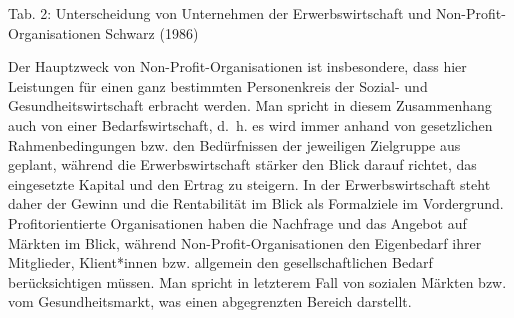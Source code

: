 \documentclass[
  letterpaper,
]{book}
\begin{document}
Tab. 2: Unterscheidung von Unternehmen der Erwerbswirtschaft und
Non-Profit-Organisationen \label{table2}{Schwarz (1986)}

Der Hauptzweck von Non-Profit-Organisationen ist insbesondere, dass hier
Leistungen für einen ganz bestimmten Personenkreis der Sozial- und
Gesundheitswirtschaft erbracht werden. Man spricht in diesem
Zusammenhang auch von einer Bedarfswirtschaft, d.~h. es wird immer
anhand von gesetzlichen Rahmenbedingungen bzw. den Bedürfnissen der
jeweiligen Zielgruppe aus geplant, während die Erwerbswirtschaft stärker
den Blick darauf richtet, das eingesetzte Kapital und den Ertrag zu
steigern. In der Erwerbswirtschaft steht daher der Gewinn und die
Rentabilität im Blick als Formalziele im Vordergrund. Profitorientierte
Organisationen haben die Nachfrage und das Angebot auf Märkten im Blick,
während Non-Profit-Organisationen den Eigenbedarf ihrer Mitglieder,
Klient*innen bzw. allgemein den gesellschaftlichen Bedarf
berücksichtigen müssen. Man spricht in letzterem Fall von sozialen
Märkten bzw. vom Gesundheitsmarkt, was einen abgegrenzten Bereich
darstellt.
\end{document}
